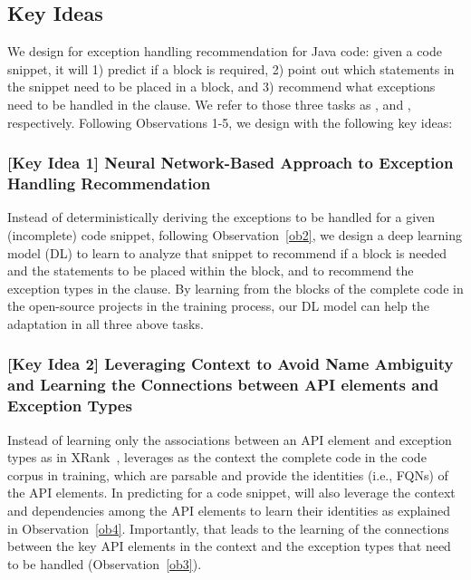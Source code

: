 \subsection{Key Ideas}
\label{key:sec}

\noindent We design {\tool} for exception handling recommendation for
Java code: given a code snippet, it will 1) predict if a
 block is required, 2) point out which statements in
the snippet need to be placed in a  block, and 3)
recommend what exceptions need to be handled in the 
clause. We refer to those three tasks as {\xblock}, {\xstate} and
{\xtype}, respectively. Following Observations 1-5, we design {\tool}
with the following key ideas:

\subsubsection{{\bf [Key Idea 1] Neural Network-Based Approach to Exception Handling Recommendation}}
Instead of deterministically deriving the exceptions to be handled for
a given (incomplete) code snippet, following Observation~\ref{ob2}, we
design a deep learning model (DL) to learn to analyze that snippet to
recommend if a  block is needed and the statements to
be placed within the  block, and to recommend the
exception types in the  clause.  By learning from the
 blocks of the complete code in the open-source
projects in the training process, our DL model can help the adaptation
in all three above tasks.


\vspace{2pt}
\subsubsection{{\bf [Key Idea 2] Leveraging Context to Avoid
Name Ambiguity and Learning the Connections between API elements and
Exception Types}} Instead of learning only the associations between an
API element and exception types as in XRank~\cite{xrank-fse20},
{\tool} leverages as the context the complete code in the code
corpus in training, which are parsable and provide the identities
(i.e., FQNs) of the API elements. In predicting for a code snippet,
{\tool} will also leverage the context and dependencies among the API
elements to learn their identities as explained in
Observation~\ref{ob4}. Importantly, that leads to the learning of the
connections between the key API elements in the context and the
exception types that need to be handled (Observation~\ref{ob3}).

